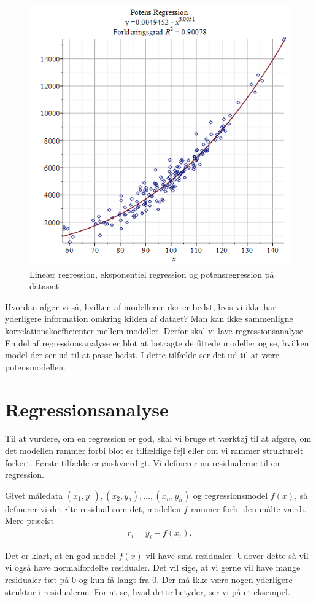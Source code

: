 \begin{exa}
\begin{figure}[H]
\includegraphics[width = \textwidth*4/10]{Billeder/PowRegtilRes.png}
\caption{Lineær regression, eksponentiel regression og potensregression på datasæt}
\label{fig:regression}
\end{figure}
Hvordan afgør vi så, hvilken af modellerne der er bedst, hvis vi ikke har yderligere information omkring kilden af dataet? Man kan ikke sammenligne korrelationskoefficienter mellem modeller. Derfor skal vi lave regressionsanalyse. En del af regressionsanalyse er blot at betragte de fittede modeller og se, hvilken model der ser ud til at passe bedst. I dette tilfælde ser det ud til at være potensmodellen. 
\end{exa}


\section*{Regressionsanalyse}

Til at vurdere, om en regression er god, skal vi bruge et værktøj til at afgøre, om det modellen rammer forbi blot er tilfældige fejl eller om vi rammer strukturelt forkert. Første tilfælde er ønskværdigt. Vi definerer nu residualerne til en regression.
\begin{defn}
Givet måledata $(x_1,y_1),(x_2,y_2),\hdots,(x_n,y_n)$ og regressionsmodel $f(x)$, så definerer vi det $i$'te residual som det, modellen $f$ rammer forbi den målte værdi. Mere præcist
\begin{align*}
r_i = y_i - f(x_i).
\end{align*} 
\end{defn}
Det er klart, at en god model $f(x)$ vil have små residualer. Udover dette så vil vi også have normalfordelte residualer. Det vil sige, at vi gerne vil have mange residualer tæt på 0 og kun få langt fra 0. Der må ikke være nogen yderligere struktur i residualerne. For at se, hvad dette betyder, ser vi på et eksempel.

